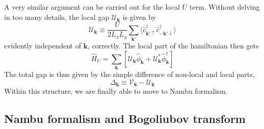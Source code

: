A very similar argument can be carried out for the local $U$ term. Without delving in too many details, the local gap $\mathcal{U}_\mathbf{k}$ is given by
\begin{equation}\label{eq:sgap-function-definition}
	\mathcal{U}_\mathbf{k} \equiv \frac{U}{2 L_x L_y} \sum_{\mathbf{k}'} \langle 
	\hat c_{\mathbf{k}'\uparrow}^\dagger \hat c_{-\mathbf{k}' \downarrow}^\dagger
	\rangle
\end{equation}
evidently independent of $\mathbf{k}$, correctly. The local part of the hamiltonian then gets
\begin{equation}\label{eq:extended-hubbard-local-interaction-mean-field-reciprocal}
	\hat H_U = \sum_\mathbf{k} \left[
		\mathcal{U}_\mathbf{k} \hat \phi_\mathbf{k} + \mathcal{U}_\mathbf{k}^* \hat \phi_\mathbf{k}^\dagger
	\right]	
\end{equation}
The total gap is thus given by the simple difference of non-local and local parts,
\[
	\Delta_\mathbf{k} \equiv \mathcal{V}_\mathbf{k} - \mathcal{U}_\mathbf{k}
\]
Within this structure, we are finally able to move to Nambu formalism.

\subsection{Nambu formalism and Bogoliubov transform}\label{subsec:nambu-formalism-mean-field-extended-hubbard}

